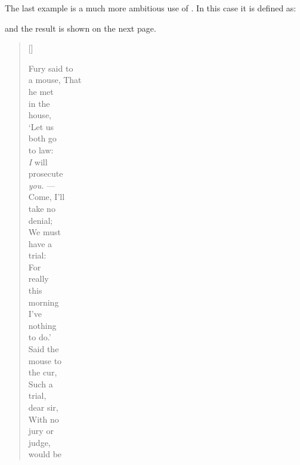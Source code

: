 
 The last example is a much more ambitious use 
of \cmd{\indentpattern}. In
this case it is defined as: 
\begin{lcode}
\end{lcode}
and the result is shown on the next page.


\clearpage
{}
\settowidth{\versewidth}{a mouse that morning}
\begin{verse}[\versewidth]
\setlength{\vgap}{1em}
\begin{patverse}
\large Fury said to \\
  a mouse, That \\
  he met \\
  in the \\
  house, \\
\normalsize `Let us \\
  both go \\
  to law: \\
  \emph{I} will \\
  prosecute \\
  \textit{you.} --- \\
  Come, I'll \\
\small take no \\
  denial; \\
  We must \\
  have a \\
  trial: \\
  For \\
\footnotesize really \\
  this \\
  morning \\
  I've \\
  nothing \\
  to do.' \\
  Said the \\
  mouse to \\
\scriptsize the cur, \\
  Such a \\
  trial, \\
  dear sir, \\
  With no \\
  jury or \\
  judge, \\
  would be \\

\end{patverse}
\end{verse}
